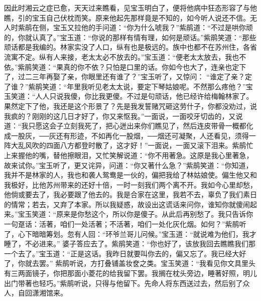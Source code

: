 \begin{parag}
    因此时湘云之症已愈，天天过来瞧看，见宝玉明白了，便将他病中狂态形容了与他瞧，引的宝玉自己伏枕而笑。原来他起先那样竟是不知的，如今听人说还不信。无人时紫鹃在侧，宝玉又拉他的手问道：“你为什么唬我？”紫鹃道：“不过是哄你顽的，你就认真了。”宝玉道：“你说的那样有情有理，如何是顽话。”紫鹃笑道：“那些顽话都是我编的。林家实没了人口，纵有也是极远的。族中也都不在苏州住，各省流寓不定。纵有人来接，老太太必不放去的。”宝玉道：“便老太太放去，我也不依。”紫鹃笑道：“果真的你不依？只怕是口里的话。你如今也大了，连亲也定下了，过二三年再娶了亲，你眼里还有谁了？”宝玉听了，又惊问： “谁定了亲？定了谁？”紫鹃笑道：“年里我听见老太太说，要定下琴姑娘呢。不然那么疼他？”宝玉笑道：“人人只说我傻，你比我更傻。不过是句顽话，他已经许给梅翰林家了。果然定下了他，我还是这个形景了？先是我发誓赌咒砸这劳什子，你都没劝过，说我疯的？刚刚的这几日才好了，你又来怄我。”一面说，一面咬牙切齿的，又说道：“我只愿这会子立刻我死了，把心迸出来你们瞧见了，然后连皮带骨一概都化成一股灰，──灰还有形迹，不如再化一股烟，──烟还可凝聚，人还看见，须得一阵大乱风吹的四面八方都登时散了，这才好！”一面说，一面又滚下泪来。紫鹃忙上来握他的嘴，替他擦眼泪，又忙笑解说道：“你不用著急。这原是我心里著急，故来试你。”宝玉听了，更又诧异，问道：“你又著什么急？”紫鹃笑道：“你知道，我并不是林家的人，我也和袭人鸳鸯是一伙的，偏把我给了林姑娘使。偏生他又和我极好，比他苏州带来的还好十倍，一时一刻我们两个离不开。我如今心里却愁，他倘或要去了，我必要跟了他去的。我是合家在这里，我若不去，辜负了我们素日的情常；若去，又弃了本家。所以我疑惑，故设出这谎话来问你，谁知你就傻闹起来。”宝玉笑道：“原来是你愁这个，所以你是傻子。从此后再别愁了。我只告诉你一句趸话：活著，咱们一处活著；不活著，咱们一处化灰化烟。如何？”紫鹃听了，心下暗暗筹划。忽有人回：“环爷兰哥儿问候。”宝玉道：“就说难为他们，我才睡了，不必进来。” 婆子答应去了。紫鹃笑道：“你也好了，该放我回去瞧瞧我们那一个去了。”宝玉道：“正是这话。我昨日就要叫你去的，偏又忘了。我已经大好了，你就去罢。” 紫鹃听说，方打叠铺盖妆奁之类。宝玉笑道：“我看见你文具里头有三两面镜子，你把那面小菱花的给我留下罢。我搁在枕头旁边，睡著好照，明儿出门带著也轻巧。”紫鹃听说，只得与他留下。先命人将东西送过去，然后别了众人，自回潇湘馆来。
\end{parag}


